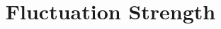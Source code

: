 \documentclass[a4paper]{report}
\begin{document}
\title{Fluctuation Strength}

\maketitle






\end{document}
